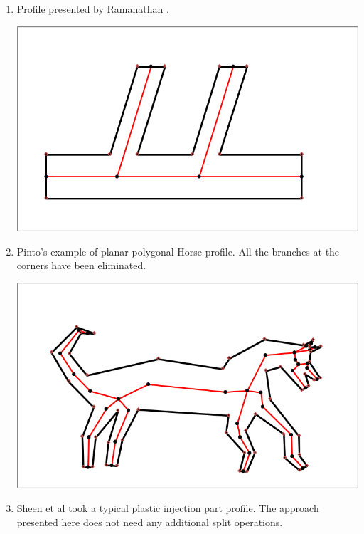 \begin{enumerate}
\item
Profile presented by Ramanathan \citep{Ramanathan2004}. %

\vspace{1mm}

\includegraphics[width=0.65\linewidth]{..//Common/images/DoubleKmc.png}%


\item
Pinto's \citep{Pinto2009} example of planar polygonal Horse profile. All the branches at the corners have been eliminated. %

\vspace{1mm}

\includegraphics[width=0.65\linewidth]{..//Common/images/Horsemc.png}%

\item
Sheen et al \citep{Sheen2010} took  a typical plastic injection part profile. The approach presented here does not need any additional split operations. %

\vspace{1mm}


\end{enumerate}
